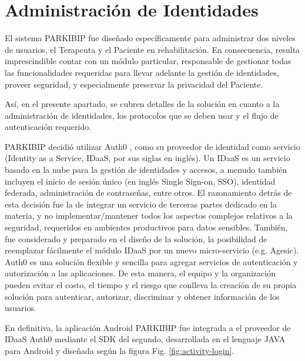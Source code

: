 \section{Administración de Identidades}

El sistema PARKIBIP fue diseñado específicamente para administrar dos niveles de usuarios, el Terapeuta y el Paciente en rehabilitación. En consecuencia, resulta imprescindible contar con un módulo particular, responsable de gestionar todas las funcionalidades requeridas para llevar adelante la gestión de identidades, proveer seguridad, y especialmente preservar la privacidad del Paciente. 

Así, en el presente apartado, se cubren detalles de la solución en cuanto a la administración de identidades, los protocolos que se deben usar y el flujo de autenticación requerido.

PARKIBIP decidió utilizar Auth0 \cite{Auth0}, como su proveedor de identidad como servicio (Identity as a Service, IDaaS, por sus siglas en inglés). Un IDaaS es un servicio basado en la nube para la gestión de identidades y accesos, a menudo también incluyen el inicio de sesión único (en inglés Single Sign-on, SSO), identidad federada, administración de contraseñas, entre otros. El razonamiento detrás de esta decisión fue la de integrar un servicio de terceras partes dedicado en la materia, y no implementar/mantener todos los aspectos complejos relativos a la seguridad, requeridos en ambientes productivos para datos sensibles. También, fue considerado y preparado en el diseño de la solución, la posibilidad de reemplazar fácilmente el módulo IDaaS por un nuevo micro-servicio (e.g. Agesic). Auth0 es una solución flexible y sencilla para agregar servicios de autenticación y autorización a las aplicaciones. De esta manera, el equipo y la organización pueden evitar el costo, el tiempo y el riesgo que conlleva la creación de su propia solución para autenticar, autorizar, discriminar y obtener información de los usuarios.

En definitiva, la aplicación Android PARKIBIP fue integrada a el proveedor de IDaaS Auth0 mediante el SDK del segundo, desarrollada en el lenguaje JAVA para Android y diseñada según la figura Fig. \ref{fig:activity-login}. 

